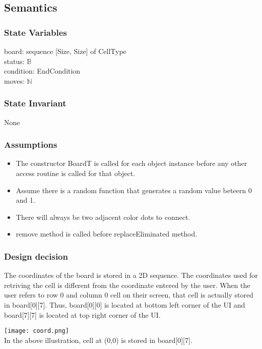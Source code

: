 \documentclass[12pt]{article}
\begin{document}
\subsection* {Semantics}

\subsubsection* {State Variables}

board: sequence [Size, Size] of CellType \\
status: $\mathbb{B}$ \\
condition: EndCondition \\
moves: $\mathbb{N}$

\subsubsection* {State Invariant}

None

\subsubsection* {Assumptions}

\begin{itemize}
  \item The constructor BoardT is called for each object instance before any other access routine 
  is called for that object. 
  \item Assume there is a random function that generates a random value beteern 0 and 1.
  \item There will always be two adjacent color dots to connect.
  \item remove method is called before replaceEliminated method.
\end{itemize}

\subsubsection* {Design decision}

The coordinates of the board is stored in a 2D sequence. The coordinates used for retriving the cell is different
from the coordinate entered by the user. When the user refers to row 0 and column 0 cell 
on their screen, that cell is actually stored in board[0][7]. Thus, board[0][0] is located at bottom left corner of the UI 
and board[7][7] is located at top right corner of the UI.

\begin{center}
  \texttt{[image: coord.png]} \\
  In the above illustration, cell at (0,0) is stored in board[0][7].
\end{center}
\end{document}
